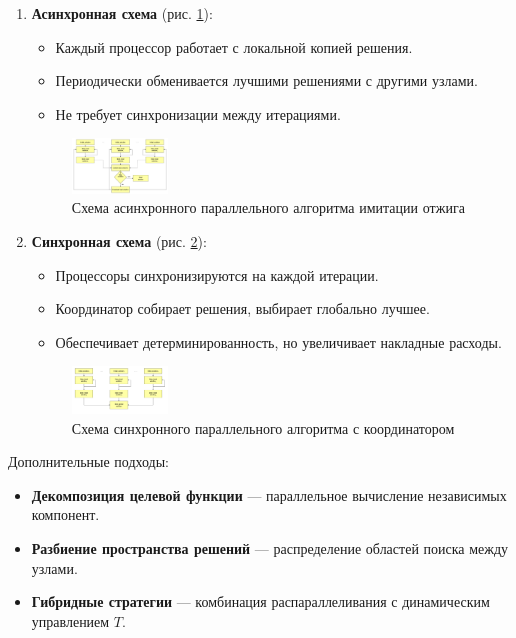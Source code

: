 \begin{enumerate}
    \item \textbf{Асинхронная схема} (рис. \ref{fig:async}):
    \begin{itemize}
        \item Каждый процессор работает с локальной копией решения.
        \item Периодически обменивается лучшими решениями с другими узлами.
        \item Не требует синхронизации между итерациями.
    \end{itemize}

    \begin{figure}[H]
        \centering
        \includegraphics[width=0.24\textwidth]{pics/IOpar1.png}
        \caption{Схема асинхронного параллельного алгоритма имитации отжига}
        \label{fig:async}
    \end{figure}

    \item \textbf{Синхронная схема} (рис. \ref{fig:sync}):
    \begin{itemize}
        \item Процессоры синхронизируются на каждой итерации.
        \item Координатор собирает решения, выбирает глобально лучшее.
        \item Обеспечивает детерминированность, но увеличивает накладные расходы.
    \end{itemize}

    \begin{figure}[H]
        \centering
        \includegraphics[width=0.24\textwidth]{pics/IOpar2.png}
        \caption{Схема синхронного параллельного алгоритма с координатором}
        \label{fig:sync}
    \end{figure}
\end{enumerate}

Дополнительные подходы:
\begin{itemize}
    \item \textbf{Декомпозиция целевой функции} — параллельное вычисление независимых компонент.
    \item \textbf{Разбиение пространства решений} — распределение областей поиска между узлами.
    \item \textbf{Гибридные стратегии} — комбинация распараллеливания с динамическим управлением $T$.
\end{itemize}


